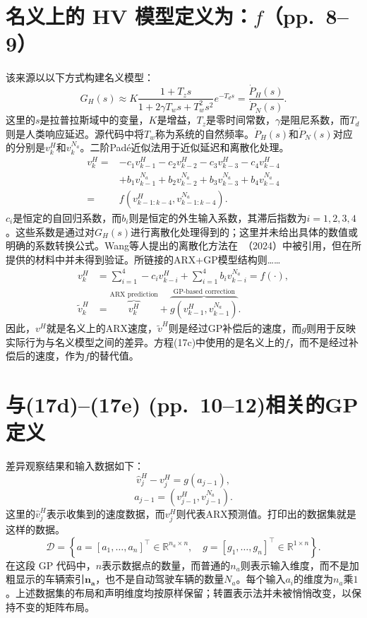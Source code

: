 \documentclass{article}
\begin{document}
\section*{名义上的 HV 模型定义为：\texorpdfstring{$f$}{f}（pp.\ 8--9）}
该来源以以下方式构建名义模型：
\begin{equation}
G_H(s)\approx K\frac{1+T_zs}{1+2\gamma T_ws+T_w^2s^2}e^{-T_ds}
 =\frac{\dot P_H(s)}{\dot P_N(s)}.\tag{1}
\end{equation}
这里的$s$是拉普拉斯域中的变量，$K$是增益，$T_z$是零时间常数，$\gamma$是阻尼系数，而$T_d$则是人类响应延迟。源代码中将$T_w$称为系统的自然频率。$\dot P_H(s)$和$\dot P_N(s)$对应的分别是$v_k^H$和$v_k^{N_a}$。二阶Pad\'e近似法用于近似延迟和离散化处理。
\begin{equation}
\begin{aligned}
v_k^H={}&-c_1v_{k-1}^H-c_2v_{k-2}^H-c_3v_{k-3}^H-c_4v_{k-4}^H\\
&+b_1v_{k-1}^{N_a}+b_2v_{k-2}^{N_a}+b_3v_{k-3}^{N_a}+b_4v_{k-4}^{N_a}\\
={}&f\left(v_{k-1:k-4}^H,v_{k-1:k-4}^{N_a}\right).
\end{aligned}\tag{2}
\end{equation}
$c_i$是恒定的自回归系数，而$b_i$则是恒定的外生输入系数，其滞后指数为$i=1,2,3,4$。这些系数是通过对$G_H(s)$进行离散化处理得到的；这里并未给出具体的数值或明确的系数转换公式。Wang等人提出的离散化方法在\ （2024）中被引用，但在所提供的材料中并未得到验证。所链接的ARX+GP模型结构则……
\begin{align}
v_k^H&=\sum_{i=1}^{4}-c_i v_{k-i}^H
       +\sum_{i=1}^{4}b_i v_{k-i}^{N_a}=f(\cdot),\tag{3a}\\
\widetilde v_k^H&=\overbrace{v_k^H}^{\text{ARX prediction}}
 +\overbrace{g(v_{k-1}^H,v_{k-1}^{N_a})}^{\text{GP-based correction}}.\tag{3b}
\end{align}
因此，$v^H$就是名义上的ARX速度，$\widetilde v^H$则是经过GP补偿后的速度，而$g$则用于反映实际行为与名义模型之间的差异。方程(17c)中使用的是名义上的$f$，而不是经过补偿后的速度，作为$f$的替代值。

\section*{与(17d)--(17e) (pp.\ 10--12)相关的GP定义}
差异观察结果和输入数据如下：
\begin{equation}
\widehat v_j^H-v_j^H=g(a_{j-1}),\tag{4}
\end{equation}
\[
a_{j-1}=(v_{j-1}^H,v_{j-1}^{N_a}).
\]
这里的$\widehat v_j^H$表示收集到的速度数据，而$v_j^H$则代表ARX预测值。打印出的数据集就是这样的数据。
\[
\mathcal D=\left\{
 a=[a_1,\ldots,a_n]^\top\in\mathbb R^{n_a\times n},\quad
 g=[g_1,\ldots,g_n]^\top\in\mathbb R^{1\times n}
\right\}.
\]
在这段 GP 代码中，$n$表示数据点的数量，而普通的$n_a$则表示输入维度，而不是加粗显示的车辆索引$\mathbf{n_a}$，也不是自动驾驶车辆的数量$N_a$。每个输入$a_i$的维度为$n_a$乘$1$。上述数据集的布局和声明维度均按原样保留；转置表示法并未被悄悄改变，以保持不变的矩阵布局。
\end{document}
